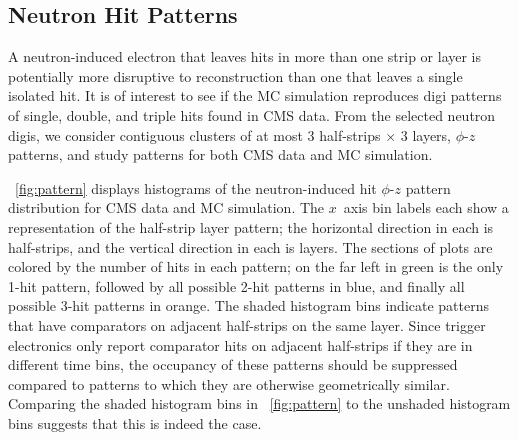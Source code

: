 
\subsection{Neutron Hit Patterns}
A neutron-induced electron that leaves hits in more than one strip or layer is potentially more disruptive to reconstruction than one that leaves a single isolated hit. It is of interest to see if the MC simulation reproduces digi patterns of single, double, and triple hits found in CMS data. From the selected neutron digis, we consider contiguous clusters of at most 3 half-strips $\times$ 3 layers, \ie $\phi$-$z$ patterns, and study patterns for both CMS data and MC simulation.

\Fig~\ref{fig:pattern} displays histograms of the neutron-induced hit $\phi$-$z$ pattern distribution for CMS data and MC simulation. The $x$~axis bin labels each show a representation of the half-strip \vs layer pattern; the horizontal direction in each is half-strips, and the vertical direction in each is layers. The sections of plots are colored by the number of hits in each pattern; on the far left in green is the only 1-hit pattern, followed by all possible 2-hit patterns in blue, and finally all possible 3-hit patterns in orange. The shaded histogram bins indicate patterns that have comparators on adjacent half-strips on the same layer. Since trigger electronics only report comparator hits on adjacent half-strips if they are in different time bins, the occupancy of these patterns should be suppressed compared to patterns to which they are otherwise geometrically similar. Comparing the shaded histogram bins in \FigDot~\ref{fig:pattern} to the unshaded histogram bins suggests that this is indeed the case.

